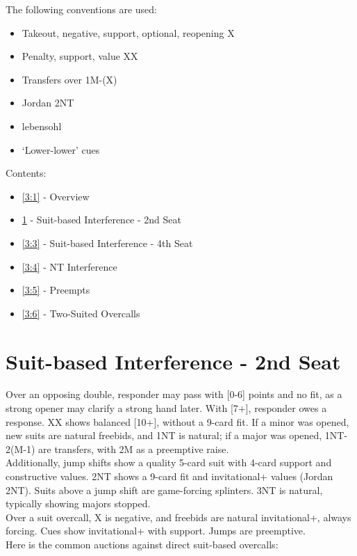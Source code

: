 \documentclass[12pt]{report}
\newcommand{\n}{\\}
\newcommand{\ul}[1]{\begin{itemize}#1\end{itemize}}
\newcommand{\li}{\item[~]}
\begin{document}
The following conventions are used:
\begin{itemize} \itemsep0em
    \item Takeout, negative, support, optional, reopening X
    \item Penalty, support, value XX
    \item Transfers over 1M-(X)
    \item Jordan 2NT
    \item lebensohl
    \item `Lower-lower' cues
\end{itemize}
Contents:
\ul {
    \li \ref{3:1} - Overview
    \li \ref{3:2} - Suit-based Interference - 2nd Seat
    \li \ref{3:3} - Suit-based Interference - 4th Seat
    \li \ref{3:4} - NT Interference
    \li \ref{3:5} - Preempts
    \li \ref{3:6} - Two-Suited Overcalls
}

\newpage
\section{Suit-based Interference - 2nd Seat} \label{3:2}
    
    Over an opposing double, responder may pass with [0-6] points and no fit, as a strong opener may clarify a strong hand later.  With [7+], responder owes a response.  XX shows balanced [10+], without a 9-card fit.  If a minor was opened, new suits are natural freebids, and 1NT is natural; if a major was opened, 1NT-2(M-1) are transfers, with 2M as a preemptive raise.\n

    Additionally, jump shifts show a quality 5-card suit with 4-card support and constructive values.  2NT shows a 9-card fit and invitational+ values (Jordan 2NT).  Suits above a jump shift are game-forcing splinters.  3NT is natural, typically showing majors stopped. \n

    Over a suit overcall, X is negative, and freebids are natural invitational+, always forcing.  Cues show invitational+ with support.  Jumps are preemptive.\n

    Here is the common auctions against direct suit-based overcalls:
    
\end{document}
